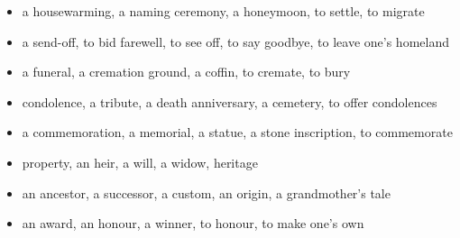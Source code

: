 \begin{itemize}
\raggedright
  \item a housewarming, a naming ceremony, a honeymoon, to settle, to migrate
  \item a send-off, to bid farewell, to see off, to say goodbye, to leave one's homeland
  \item a funeral, a cremation ground, a coffin, to cremate, to bury
  \item condolence, a tribute, a death anniversary, a cemetery, to offer condolences
  \item a commemoration, a memorial, a statue, a stone inscription, to commemorate
  \item property, an heir, a will, a widow, heritage
  \item an ancestor, a successor, a custom, an origin, a grandmother's tale
  \item an award, an honour, a winner, to honour, to make one's own
\end{itemize}

